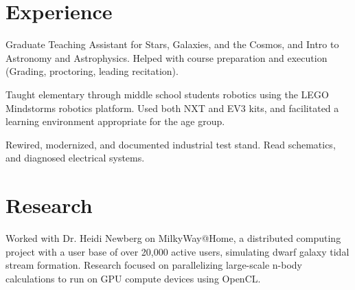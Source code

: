 \documentclass[letterpaper]{deedy-resume} %
\begin{document}
\begin{minipage}[t]{0.66\textwidth} %


\section{Experience}

Graduate Teaching Assistant for Stars, Galaxies, and the Cosmos, and Intro to Astronomy and Astrophysics. Helped with course
preparation and execution (Grading, proctoring, leading recitation).
\vspace{3pt}\\


Taught elementary through middle school students robotics using the LEGO
Mindstorms robotics platform. Used both NXT and EV3 kits, and facilitated a learning
environment appropriate for the age group.
\vspace{3pt}\\


Rewired, modernized, and documented industrial test stand. Read schematics, and
diagnosed electrical systems.

\section{Research}


Worked with Dr. Heidi Newberg on MilkyWay@Home, a distributed computing
project with a user base of over 20,000 active users, simulating dwarf galaxy tidal
stream formation. Research focused on parallelizing large-scale n-body calculations
to run on GPU compute devices using OpenCL.




\end{minipage}
\end{document}
